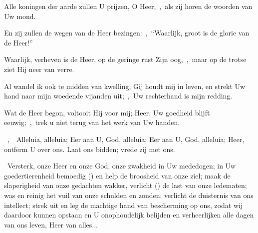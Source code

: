 \documentclass[12pt,twoside,a5paper]{article}
\begin{document}
\begin{halfparskip}
  Alle koningen der aarde zullen U prijzen, O Heer,~\sep\ als zij horen de woorden van Uw mond.

  En zij zullen de wegen van de Heer bezingen:~\sep\ ``Waarlijk, groot is de glorie van de Heer!''

  Waarlijk, verheven is de Heer, op de geringe rust Zijn oog,~\sep\ maar op de trotse ziet Hij neer van verre.

  Al wandel ik ook te midden van kwelling, Gij houdt mij in leven, en strekt Uw hand naar mijn woedende vijanden uit;~\sep\ Uw rechterhand is mijn redding.

  Wat de Heer begon, voltooit Hij voor mij; Heer, Uw goedheid blijft eeuwig;~\sep\ trek u niet terug van het werk van Uw handen.
\end{halfparskip}

\begin{halfparskip}
  ~\sep\ \dd~Alleluia, alleluia; Eer aan U, God, alleluia; Eer aan U, God, alleluia; Heer, ontferm U over ons. Laat ons bidden; vrede zij met ons.

  \cc~Versterk, onze Heer en onze God, onze zwakheid in Uw mededogen; in Uw goedertierenheid bemoedig
  () en help de broosheid van onze ziel; maak de slaperigheid van onze gedachten wakker, verlicht () de last van onze ledematen; was en reinig het vuil van onze schulden en zonden; verlicht de duisternis van ons intellect; strek uit en leg de machtige hand van bescherming op ons, zodat wij daardoor kunnen opstaan en U onophoudelijk belijden en verheerlijken alle dagen van ons leven, Heer van alles...
\end{halfparskip}

\end{document}
